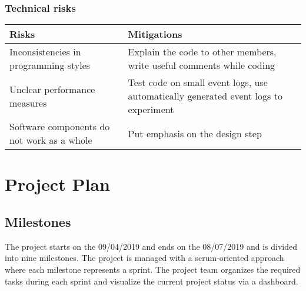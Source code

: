 \documentclass[notitlepage]{article}
\begin{document}
\begin{flushleft}
\subsubsection{Technical risks}

\begin{tabularx}{15cm}{|X|X|}
\hline
\textbf{Risks} &\textbf{Mitigations}\\
\hline
Inconsistencies in programming styles & Explain the code to other members, write useful comments while coding\\
\hline
Unclear performance measures & Test code on small event logs, use automatically generated event logs to experiment \\
\hline
Software components do not work as a whole & Put emphasis on the design step \\ 
\hline
\end{tabularx}



\section{Project Plan}

\subsection{Milestones}

The project starts on the 09/04/2019 and ends on the 08/07/2019 and is divided into nine milestones. The project is managed with a scrum-oriented approach
where each milestone represents a sprint. The project team organizes the required tasks during each sprint and visualize the current project status via a dashboard.


\end{flushleft}
\end{document}
